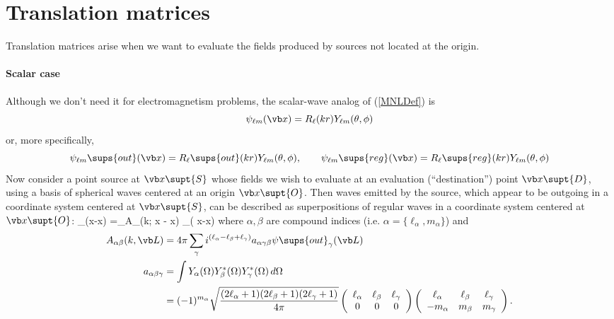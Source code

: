 \documentclass[letterpaper]{article}
\newcommand{\lm}{_{\ell m}}
\begin{document}
\newpage
\section{Translation matrices}
\label{TranslationMatrixSection}

Translation matrices arise when we want to evaluate the fields
produced by sources not located at the origin. 

\paragraph{Scalar case}
Although we don't need it for electromagnetism problems,
the scalar-wave analog of (\ref{MNLDef}) is
$$ \psi\lm(\vb x) = R_\ell(kr)Y\lm(\theta,\phi)$$
or, more specifically,
$$ \psi\lm\sups{out}(\vb x) = R_\ell\sups{out}(kr)Y\lm(\theta,\phi),
   \qquad
   \psi\lm\sups{reg}(\vb x) = R_\ell\sups{reg}(kr)Y\lm(\theta,\phi)
$$
Now consider a point source at $\vb x\supt{S}$ whose fields we wish
to evaluate at an evaluation (``destination'') point $\vb x\supt{D}$,
using a basis of spherical waves centered at an origin $\vb x\supt{O}$.
Then waves emitted by the source, which appear to be outgoing in a
coordinate system centered at $\vb x\supt{S}$, can be described
as superpositions of regular waves in a coordinate system
centered at $\vb x\supt{O}$:
{ \psi{}_\alpha\big(\vb x-\vb x\big)
   =\sum_\beta A_{\alpha\beta}\big(k; \vb x - \vb x\big)
               \psi{}_\beta\big( \vb x-\vb x\big)
}
where $\alpha,\beta$ are compound indices 
(i.e. $\alpha=\{\ell_\alpha, m_\alpha\}$) and 
\begin{align*}
 A_{\alpha\beta}(k, \vb L)
&=4\pi 
  \sum_\gamma i^{(\ell_\alpha - \ell_\beta + \ell_\gamma)}
  a_{\alpha\gamma\beta} 
  \psi\sups{out}_\gamma(\vb L)
\\
a_{\alpha\beta\gamma}
&=\int Y_\alpha(\Omega) Y^*_\beta(\Omega) Y^*_\gamma(\Omega) \, d\Omega
\\
&=(-1)^{m_\alpha}
  \sqrt\frac{ (2\ell_\alpha+1)(2\ell_\beta+1) (2\ell_\gamma+1)}
            {4\pi}
  \left(\begin{array}{ccc} 
        \ell_\alpha & \ell_\beta & \ell_\gamma \\ 0 & 0 & 0 
        \end{array}\right)
  \left(\begin{array}{ccc} 
        \ell_\alpha & \ell_\beta & \ell_\gamma \\ 
          -m_\alpha & m_\beta    & m_\gamma
        \end{array}\right).
\end{align*}
\end{document}
